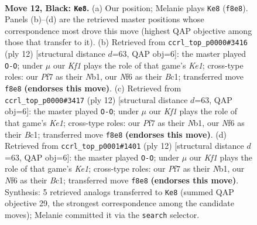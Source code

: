 \documentclass[11pt]{article}
\begin{document}
\clearpage

\begin{figure}[p]\centering
\begin{subfigure}{0.46\textwidth}\centering
\resizebox{\linewidth}{!}{%
\newchessgame
\chessboard[
  setfen={rnbq1kr1/pp2bppp/5n2/3p2N1/3P4/2N5/PP3PPP/R1BQKB1R b - - 7 12},
  showmover=false,
  pgfstyle=straightmove, color=movearrow, markmove={f8-e8}
]}
\caption{}
\end{subfigure}\hfill
\begin{subfigure}{0.46\textwidth}\centering
\resizebox{\linewidth}{!}{%
\newchessgame
\chessboard[
  setfen={r1bqkb1r/ppp2ppp/2n5/3p4/3Pn3/3B1N2/PPP2PPP/RNBQK2R w KQkq - 2 7},
  showmover=false,
  pgfstyle=straightmove, color=movearrow, markmove={e1-g1}
]}
\caption{}
\end{subfigure}
\\[4pt]
\begin{subfigure}{0.46\textwidth}\centering
\resizebox{\linewidth}{!}{%
\newchessgame
\chessboard[
  setfen={r1bqkb1r/ppp2ppp/2n5/3p4/3Pn3/3B1N2/PPP2PPP/RNBQK2R w KQkq - 2 7},
  showmover=false,
  pgfstyle=straightmove, color=movearrow, markmove={e1-g1}
]}
\caption{}
\end{subfigure}\hfill
\begin{subfigure}{0.46\textwidth}\centering
\resizebox{\linewidth}{!}{%
\newchessgame
\chessboard[
  setfen={r1bqkb1r/ppp2ppp/2n5/3p4/3Pn3/3B1N2/PPP2PPP/RNBQK2R w KQkq - 2 7},
  showmover=false,
  pgfstyle=straightmove, color=movearrow, markmove={e1-g1}
]}
\caption{}
\end{subfigure}
\caption{\textbf{Move 12, Black: \texttt{Ke8}.} (a) Our position; Melanie plays \texttt{Ke8} (\texttt{f8e8}). Panels (b)--(d) are the retrieved master positions whose correspondence most drove this move (highest QAP objective among those that transfer to it). (b) Retrieved from \texttt{ccrl\_top\_p0000\#3416} (ply 12) [structural distance $d$=63, QAP obj=6]: the master played \texttt{O-O}; under $\mu$ our \emph{Kf1} plays the role of that game's \emph{Ke1}; cross-type roles: our \emph{P}f7 as their \emph{N}b1, our \emph{N}f6 as their \emph{B}c1; transferred move \texttt{f8e8} \textbf{(endorses this move)}. (c) Retrieved from \texttt{ccrl\_top\_p0000\#3417} (ply 12) [structural distance $d$=63, QAP obj=6]: the master played \texttt{O-O}; under $\mu$ our \emph{Kf1} plays the role of that game's \emph{Ke1}; cross-type roles: our \emph{P}f7 as their \emph{N}b1, our \emph{N}f6 as their \emph{B}c1; transferred move \texttt{f8e8} \textbf{(endorses this move)}. (d) Retrieved from \texttt{ccrl\_top\_p0001\#1401} (ply 12) [structural distance $d$=63, QAP obj=6]: the master played \texttt{O-O}; under $\mu$ our \emph{Kf1} plays the role of that game's \emph{Ke1}; cross-type roles: our \emph{P}f7 as their \emph{N}b1, our \emph{N}f6 as their \emph{B}c1; transferred move \texttt{f8e8} \textbf{(endorses this move)}. Synthesis: 5 retrieved analogs transferred to \texttt{Ke8} (summed QAP objective 29, the strongest correspondence among the candidate moves); Melanie committed it via the \texttt{search} selector.}
\label{fig:thought-m23}
\end{figure}
\end{document}
